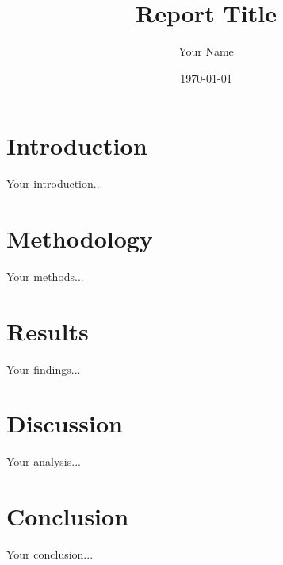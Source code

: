 \documentclass[12pt,a4paper]{report}
\title{Report Title}
\author{Your Name}
\date{\today}
\begin{document}
\maketitle
\tableofcontents
\listoffigures
\listoftables

\chapter{Introduction}
Your introduction...

\chapter{Methodology}
Your methods...

\chapter{Results}
Your findings...

\chapter{Discussion}
Your analysis...

\chapter{Conclusion}
Your conclusion...
\end{document}
